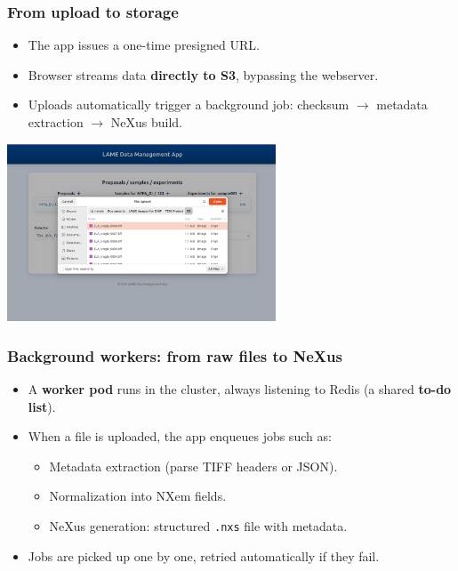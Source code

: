 \documentclass{beamer}
\begin{document}
	\begin{frame}
		\frametitle{From upload to storage}
		
		\begin{itemize}
			\item The app issues a one-time presigned URL.
			\item Browser streams data \textbf{directly to S3}, bypassing the webserver.
			\item Uploads automatically trigger a background job:
			checksum $\to$ metadata extraction $\to$ NeXus build.
		\end{itemize}
		
		\vspace{1em}
		\centering
		\includegraphics[width=0.6\textwidth]{otherResources/ui_file_picker.png}
	\end{frame}
	
	\begin{frame}
		\frametitle{Background workers: from raw files to NeXus}
		
		\begin{itemize}
			\item A \textbf{worker pod} runs in the cluster, always listening to Redis (a shared \textbf{to-do list}).  
			\item When a file is uploaded, the app enqueues jobs such as:  
			\begin{itemize}
				\item Metadata extraction (parse TIFF headers or JSON).  
				\item Normalization into NXem fields.  
				\item NeXus generation: structured \texttt{.nxs} file with metadata.  
			\end{itemize}
			\item Jobs are picked up one by one, retried automatically if they fail.  
		\end{itemize}
	\end{frame}
	
\end{document}
